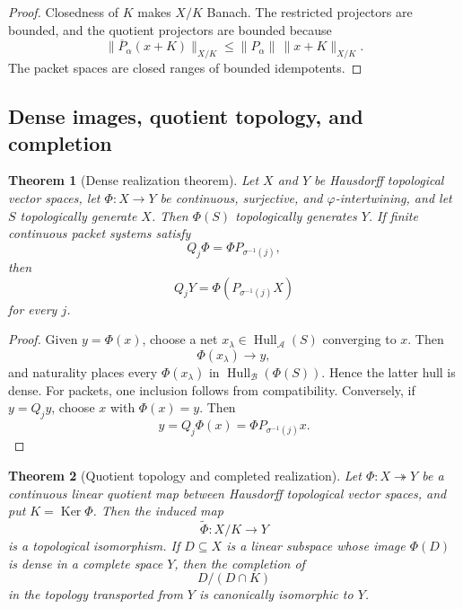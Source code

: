 \documentclass[11pt]{article}
\newtheorem{theorem}{Theorem}[section]
\theoremstyle{definition}
\theoremstyle{remark}
\theoremstyle{definition}\newtheorem{example}[theorem]{Example}
\newcommand{\A}{\mathcal A}
\newcommand{\B}{\mathcal B}
\newcommand{\Hull}{\operatorname{Hull}}
\newcommand{\Ker}{\operatorname{Ker}}
\newcommand{\RecordID}[1]{\label{record:#1}}
\newcommand{\Depends}[1]{}
\begin{document}
\begin{proof}
Closedness of $K$ makes $X/K$ Banach.  The restricted projectors are bounded, and the quotient projectors are bounded because
\[
\|\overline P_\alpha(x+K)\|_{X/K}
\leq
\|P_\alpha\|\,\|x+K\|_{X/K}.
\]
The packet spaces are closed ranges of bounded idempotents.
\end{proof}

\subsection{Dense images, quotient topology, and completion}
\begin{theorem}[Dense realization theorem]
\label{thm:dense-realization}
Let $X$ and $Y$ be Hausdorff topological vector spaces, let $\Phi:X\to Y$ be continuous, surjective, and $\varphi$-intertwining, and let $S$ topologically generate $X$.  Then $\Phi(S)$ topologically generates $Y$.  If finite continuous packet systems satisfy
\[
Q_j\Phi=\Phi P_{\sigma^{-1}(j)},
\]
then
\[
\boxed{
Q_jY=\Phi(P_{\sigma^{-1}(j)}X)
}
\]
for every $j$.
\end{theorem}
\RecordID{PSC-I-T-DENSE-REALIZATION}
\Depends{PSC-I-T-NATURALITY.}

\begin{proof}
Given $y=\Phi(x)$, choose a net $x_\lambda\in\Hull_\A(S)$ converging to $x$.  Then
\[
\Phi(x_\lambda)\to y,
\]
and naturality places every $\Phi(x_\lambda)$ in $\Hull_\B(\Phi(S))$.  Hence the latter hull is dense.  For packets, one inclusion follows from compatibility.  Conversely, if $y=Q_jy$, choose $x$ with $\Phi(x)=y$.  Then
\[
y=Q_j\Phi(x)=\Phi P_{\sigma^{-1}(j)}x.
\]
\end{proof}

\begin{theorem}[Quotient topology and completed realization]
\label{thm:quotient-topology}
Let $\Phi:X\twoheadrightarrow Y$ be a continuous linear quotient map between Hausdorff topological vector spaces, and put $K=\Ker\Phi$.  Then the induced map
\[
\widetilde\Phi:X/K\longrightarrow Y
\]
is a topological isomorphism.  If $D\subseteq X$ is a linear subspace whose image $\Phi(D)$ is dense in a complete space $Y$, then the completion of
\[
D/(D\cap K)
\]
in the topology transported from $Y$ is canonically isomorphic to $Y$.
\end{theorem}
\RecordID{PSC-I-T-QUOTIENT-TOPOLOGY-COMPLETION}
\Depends{PSC-I-T-COMPLETED-PRESENTATION, the definition of quotient topology, and uniqueness of completion.}
\end{document}
